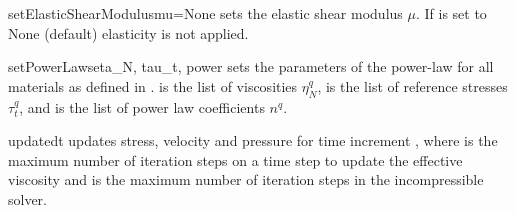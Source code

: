 \begin{methoddesc}[IncompressibleIsotropicFlowCartesian]{setElasticShearModulus}{mu=None}
sets the elastic shear modulus $\mu$. If  is set to None (default)
elasticity is not applied.
\end{methoddesc}


\begin{methoddesc}[IncompressibleIsotropicFlowCartesian]{setPowerLaws}{eta_N, tau_t, power}
sets the parameters of the power-law for all materials as defined in .
 is the list of viscosities $\eta^{q}_{N}$,
 is the list of reference stresses  $\tau_{t}^q$,
and  is the list of power law coefficients $n^{q}$.
\end{methoddesc}

\begin{methoddesc}[IncompressibleIsotropicFlowCartesian]{update}{dt
}
updates stress, velocity and pressure for time increment , where
 is the maximum number of iteration steps on a time step to
update the effective viscosity and  is the maximum
number of iteration steps in the incompressible solver.
\end{methoddesc}





